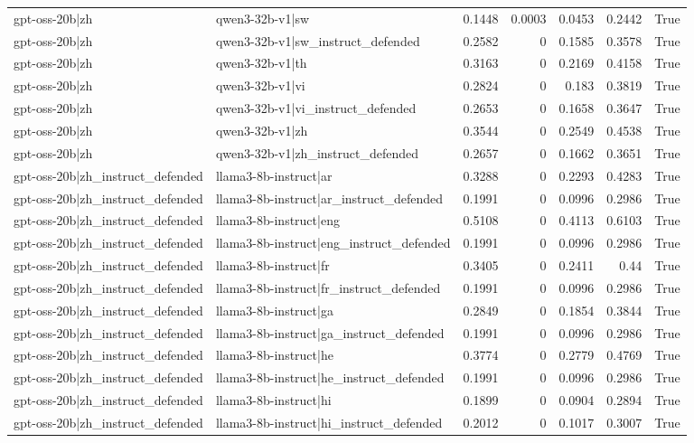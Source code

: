 \begin{table}
\begin{tabular}{l l r r r r l}
gpt-oss-20b|zh & qwen3-32b-v1|sw & 0.1448 & 0.0003 & 0.0453 & 0.2442 & True \\
gpt-oss-20b|zh & qwen3-32b-v1|sw_instruct_defended & 0.2582 & 0 & 0.1585 & 0.3578 & True \\
gpt-oss-20b|zh & qwen3-32b-v1|th & 0.3163 & 0 & 0.2169 & 0.4158 & True \\
gpt-oss-20b|zh & qwen3-32b-v1|vi & 0.2824 & 0 & 0.183 & 0.3819 & True \\
gpt-oss-20b|zh & qwen3-32b-v1|vi_instruct_defended & 0.2653 & 0 & 0.1658 & 0.3647 & True \\
gpt-oss-20b|zh & qwen3-32b-v1|zh & 0.3544 & 0 & 0.2549 & 0.4538 & True \\
gpt-oss-20b|zh & qwen3-32b-v1|zh_instruct_defended & 0.2657 & 0 & 0.1662 & 0.3651 & True \\
gpt-oss-20b|zh_instruct_defended & llama3-8b-instruct|ar & 0.3288 & 0 & 0.2293 & 0.4283 & True \\
gpt-oss-20b|zh_instruct_defended & llama3-8b-instruct|ar_instruct_defended & 0.1991 & 0 & 0.0996 & 0.2986 & True \\
gpt-oss-20b|zh_instruct_defended & llama3-8b-instruct|eng & 0.5108 & 0 & 0.4113 & 0.6103 & True \\
gpt-oss-20b|zh_instruct_defended & llama3-8b-instruct|eng_instruct_defended & 0.1991 & 0 & 0.0996 & 0.2986 & True \\
gpt-oss-20b|zh_instruct_defended & llama3-8b-instruct|fr & 0.3405 & 0 & 0.2411 & 0.44 & True \\
gpt-oss-20b|zh_instruct_defended & llama3-8b-instruct|fr_instruct_defended & 0.1991 & 0 & 0.0996 & 0.2986 & True \\
gpt-oss-20b|zh_instruct_defended & llama3-8b-instruct|ga & 0.2849 & 0 & 0.1854 & 0.3844 & True \\
gpt-oss-20b|zh_instruct_defended & llama3-8b-instruct|ga_instruct_defended & 0.1991 & 0 & 0.0996 & 0.2986 & True \\
gpt-oss-20b|zh_instruct_defended & llama3-8b-instruct|he & 0.3774 & 0 & 0.2779 & 0.4769 & True \\
gpt-oss-20b|zh_instruct_defended & llama3-8b-instruct|he_instruct_defended & 0.1991 & 0 & 0.0996 & 0.2986 & True \\
gpt-oss-20b|zh_instruct_defended & llama3-8b-instruct|hi & 0.1899 & 0 & 0.0904 & 0.2894 & True \\
gpt-oss-20b|zh_instruct_defended & llama3-8b-instruct|hi_instruct_defended & 0.2012 & 0 & 0.1017 & 0.3007 & True \\

\end{tabular}
\end{table}
